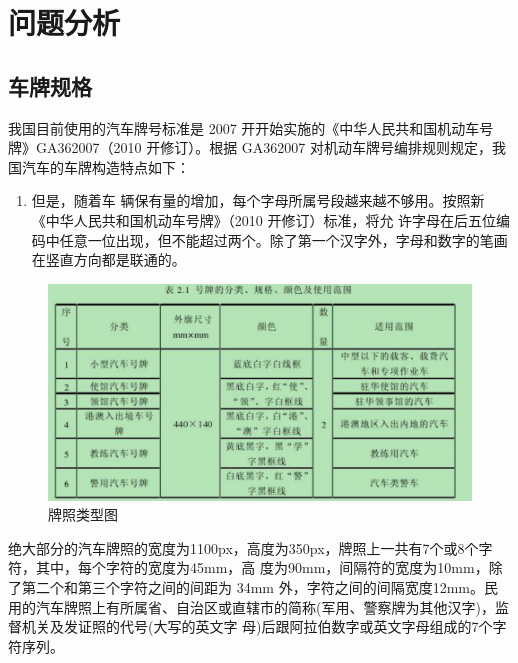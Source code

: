 \chapter{问题分析}
\section{车牌规格}

我国目前使用的汽车牌号标准是 2007 开开始实施的《中华人民共和国机动车号牌》GA36­2007（2010 开修订）。根据
GA36­2007 对机动车牌号编排规则规定，我国汽车的车牌构造特点如下：

\begin{enumerate}
：我国的标准车辆车牌是由一个省份汉字（军警车牌为其他汉字）后跟字母或阿拉伯数字组成
的 7 个字序列。
：X1X2∙X3X4X5X6X7，X1是各省、直辖市的简称或军警，X2是英文字
母，代表该汽车所在地的地市代码，比如 A 代表省会，B 代表该省的第二大城市，C 代表该省的第三大城市，
X3X4X5X6X7为英文字母或阿拉伯数字，2010开以前车牌号码的分布规律是，前面是字母，后面是数字。
\item 但是，随着车
辆保有量的增加，每个字母所属号段越来越不够用。按照新《中华人民共和国机动车号牌》（2010 开修订）标准，将允
许字母在后五位编码中任意一位出现，但不能超过两个。除了第一个汉字外，字母和数字的笔画在竖直方向都是联通的。
\end{enumerate}

\begin{figure}[h]
	\centering
	\includegraphics[scale=0.5]{figures/3.png}
	\caption{牌照类型图}
	\label{fig:1}
\end{figure}

绝大部分的汽车牌照的宽度为1100px，高度为350px，牌照上一共有7个或8个字符，其中，每个字符的宽度为45mm，高
度为90mm，间隔符的宽度为10mm，除了第二个和第三个字符之间的间距为 34mm 外，字符之间的间隔宽度12mm。民
用的汽车牌照上有所属省、自治区或直辖市的简称(军用、警察牌为其他汉字)，监督机关及发证照的代号(大写的英文字
母)后跟阿拉伯数字或英文字母组成的7个字符序列。

